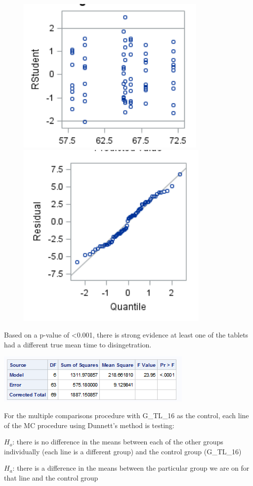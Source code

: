 \documentclass{article}\usepackage[]{graphicx}\usepackage[]{color}
\begin{document}
\begin{enumerate}
\begin{enumerate}
\begin{figure}[h!]
\centering
\begin{minipage}{.5\textwidth}
  \centering
  \includegraphics[width=.4\linewidth]{prob1cplots}
  \end{minipage}%
\begin{minipage}{.5\textwidth}
  \centering
  \includegraphics[width=.4\linewidth]{prob1cplots1}
\end{minipage}
\end{figure}

Based on a p-value of \textless 0.001, there is strong evidence at least one of the tablets had a different true mean time to disingetration.

\includegraphics{prob1c}

For the multiple comparisons procedure with G\_TL\_16 as the control, each line of the MC procedure using Dunnett's method is testing:

$H_{o}$: there is no difference in the means between each of the other groups individually (each line is a different group) and the control group (G\_TL\_16)

$H_{a}$: there is a difference in the means between the particular group we are on for that line and the control group


\end{enumerate}
\end{enumerate}
\end{document}
